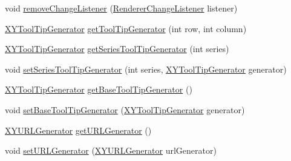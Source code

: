 \begin{DoxyCompactItemize}
\item 
void \mbox{\hyperlink{interfaceorg_1_1jfree_1_1chart_1_1renderer_1_1_polar_item_renderer_a643f02dd9cbde3f33cac94589245fdc4}{remove\+Change\+Listener}} (\mbox{\hyperlink{interfaceorg_1_1jfree_1_1chart_1_1event_1_1_renderer_change_listener}{Renderer\+Change\+Listener}} listener)
\item 
\mbox{\hyperlink{interfaceorg_1_1jfree_1_1chart_1_1labels_1_1_x_y_tool_tip_generator}{X\+Y\+Tool\+Tip\+Generator}} \mbox{\hyperlink{interfaceorg_1_1jfree_1_1chart_1_1renderer_1_1_polar_item_renderer_a88d1545f3fbb8aaddc89b2afb5ffb050}{get\+Tool\+Tip\+Generator}} (int row, int column)
\item 
\mbox{\hyperlink{interfaceorg_1_1jfree_1_1chart_1_1labels_1_1_x_y_tool_tip_generator}{X\+Y\+Tool\+Tip\+Generator}} \mbox{\hyperlink{interfaceorg_1_1jfree_1_1chart_1_1renderer_1_1_polar_item_renderer_a88c82899310074e147185e59d46060b2}{get\+Series\+Tool\+Tip\+Generator}} (int series)
\item 
void \mbox{\hyperlink{interfaceorg_1_1jfree_1_1chart_1_1renderer_1_1_polar_item_renderer_a38f9cc455c80c0b6e937bd759a62e3a2}{set\+Series\+Tool\+Tip\+Generator}} (int series, \mbox{\hyperlink{interfaceorg_1_1jfree_1_1chart_1_1labels_1_1_x_y_tool_tip_generator}{X\+Y\+Tool\+Tip\+Generator}} generator)
\item 
\mbox{\hyperlink{interfaceorg_1_1jfree_1_1chart_1_1labels_1_1_x_y_tool_tip_generator}{X\+Y\+Tool\+Tip\+Generator}} \mbox{\hyperlink{interfaceorg_1_1jfree_1_1chart_1_1renderer_1_1_polar_item_renderer_aeac8f5482fc07b86565f1efce8805e2d}{get\+Base\+Tool\+Tip\+Generator}} ()
\item 
void \mbox{\hyperlink{interfaceorg_1_1jfree_1_1chart_1_1renderer_1_1_polar_item_renderer_a8228783ae5afbc99459106111e892a99}{set\+Base\+Tool\+Tip\+Generator}} (\mbox{\hyperlink{interfaceorg_1_1jfree_1_1chart_1_1labels_1_1_x_y_tool_tip_generator}{X\+Y\+Tool\+Tip\+Generator}} generator)
\item 
\mbox{\hyperlink{interfaceorg_1_1jfree_1_1chart_1_1urls_1_1_x_y_u_r_l_generator}{X\+Y\+U\+R\+L\+Generator}} \mbox{\hyperlink{interfaceorg_1_1jfree_1_1chart_1_1renderer_1_1_polar_item_renderer_afe0889dc56f6a7a66f5c743b51548ff5}{get\+U\+R\+L\+Generator}} ()
\item 
void \mbox{\hyperlink{interfaceorg_1_1jfree_1_1chart_1_1renderer_1_1_polar_item_renderer_a8809317358c46f995ce56e79857ff96e}{set\+U\+R\+L\+Generator}} (\mbox{\hyperlink{interfaceorg_1_1jfree_1_1chart_1_1urls_1_1_x_y_u_r_l_generator}{X\+Y\+U\+R\+L\+Generator}} url\+Generator)
\end{DoxyCompactItemize}


